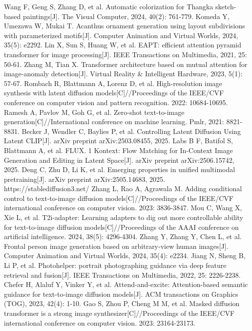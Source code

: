 \documentclass[sn-mathphys]{sn-jnl}%
\theoremstyle{thmstyleone}%
\theoremstyle{thmstyletwo}%
\theoremstyle{thmstylethree}%
\begin{document}
\begin{thebibliography}{00}
	 Wang F, Geng S, Zhang D, et al. Automatic colorization for Thangka sketch-based paintings[J]. The Visual Computer, 2024, 40(2): 761-779.
	 Komeda Y, Umezawa W, Mukai T. Acanthus ornament generation using layout subdivisions with parameterized motifs[J]. Computer Animation and Virtual Worlds, 2024, 35(5): e2292. 
	 Lin X, Sun S, Huang W, et al. EAPT: efficient attention pyramid transformer for image processing[J]. IEEE Transactions on Multimedia, 2021, 25: 50-61.
	 Zhang M, Tian X. Transformer architecture based on mutual attention for image-anomaly detection[J]. Virtual Reality \& Intelligent Hardware, 2023, 5(1): 57-67.
	 Rombach R, Blattmann A, Lorenz D, et al. High-resolution image synthesis with latent diffusion models[C]//Proceedings of the IEEE/CVF conference on computer vision and pattern recognition. 2022: 10684-10695.
	 Ramesh A, Pavlov M, Goh G, et al. Zero-shot text-to-image generation[C]//International conference on machine learning. Pmlr, 2021: 8821-8831.
	 Becker J, Wendler C, Baylies P, et al. Controlling Latent Diffusion Using Latent CLIP[J]. arXiv preprint arXiv:2503.08455, 2025.
	 Labs B F, Batifol S, Blattmann A, et al. FLUX. 1 Kontext: Flow Matching for In-Context Image Generation and Editing in Latent Space[J]. arXiv preprint arXiv:2506.15742, 2025.
	 Deng C, Zhu D, Li K, et al. Emerging properties in unified multimodal pretraining[J]. arXiv preprint arXiv:2505.14683, 2025.
	 https://stablediffusion3.net/
	 Zhang L, Rao A, Agrawala M. Adding conditional control to text-to-image diffusion models[C]//Proceedings of the IEEE/CVF international conference on computer vision. 2023: 3836-3847.
	 Mou C, Wang X, Xie L, et al. T2i-adapter: Learning adapters to dig out more controllable ability for text-to-image diffusion models[C]//Proceedings of the AAAI conference on artificial intelligence. 2024, 38(5): 4296-4304.
	 Zhang Y, Zhang Y, Chen L, et al. Frontal person image generation based on arbitrary‐view human images[J]. Computer Animation and Virtual Worlds, 2024, 35(4): e2234.
	 Jiang N, Sheng B, Li P, et al. Photohelper: portrait photographing guidance via deep feature retrieval and fusion[J]. IEEE Transactions on Multimedia, 2022, 25: 2226-2238.
	 Chefer H, Alaluf Y, Vinker Y, et al. Attend-and-excite: Attention-based semantic guidance for text-to-image diffusion models[J]. ACM transactions on Graphics (TOG), 2023, 42(4): 1-10.
	 Gao S, Zhou P, Cheng M M, et al. Masked diffusion transformer is a strong image synthesizer[C]//Proceedings of the IEEE/CVF international conference on computer vision. 2023: 23164-23173.

\end{thebibliography}
\end{document}
